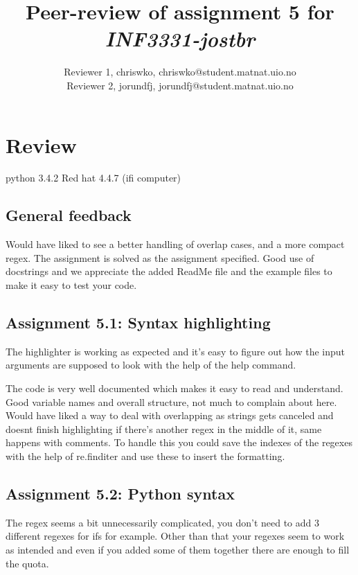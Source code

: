 \documentclass[a4paper]{article}
\title{Peer-review of assignment 5 for \textit{INF3331-jostbr}}
\author{Reviewer 1, chriswko, {chriswko@student.matnat.uio.no} \\
 		Reviewer 2, jorundfj, {jorundfj@student.matnat.uio.no}}
\begin{document}
\maketitle



\section{Review}\label{sec:review}

python 3.4.2 Red hat 4.4.7 (ifi computer)
\subsection*{General feedback}
Would have liked to see a better handling of overlap cases, and a more compact regex. The assignment is solved as the assignment specified. Good use of docstrings and we appreciate the added ReadMe file and the example files to make it easy to test your code.
\subsection*{Assignment 5.1: Syntax highlighting}

The highlighter is working as expected and it's easy to figure out how the input arguments are supposed to look with the help of the help command.

\vspace{5mm}

\noindent The code is very well documented which makes it easy to read and understand. Good variable names and overall structure, not much to complain about here. Would have liked a way to deal with overlapping as strings gets canceled and doesnt finish highlighting if there's another regex in the middle of it, same happens with comments. To handle this you could save the indexes of the regexes with the help of re.finditer and use these to insert the formatting. 

\subsection*{Assignment 5.2: Python syntax} \label{sec:assignment5.2}

The regex seems a bit unnecessarily  complicated, you don't need to add 3 different regexes for ifs for example. Other than that your regexes seem to work as intended and even if you added some of them together there are enough to fill the quota.
\end{document}
